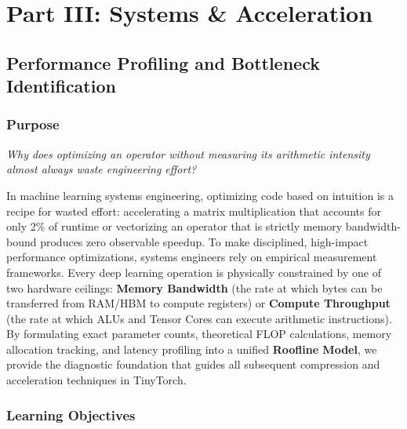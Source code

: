 \documentclass[
  letterpaper,
]{scrbook}
\begin{document}
\part{Part III: Systems \& Acceleration}

\chapter{Performance Profiling and Bottleneck
Identification}\label{performance-profiling-and-bottleneck-identification}

\section*{Purpose}\label{purpose-16}


\emph{Why does optimizing an operator without measuring its arithmetic
intensity almost always waste engineering effort?}

In machine learning systems engineering, optimizing code based on
intuition is a recipe for wasted effort: accelerating a matrix
multiplication that accounts for only 2\% of runtime or vectorizing an
operator that is strictly memory bandwidth-bound produces zero
observable speedup. To make disciplined, high-impact performance
optimizations, systems engineers rely on empirical measurement
frameworks. Every deep learning operation is physically constrained by
one of two hardware ceilings: \textbf{Memory Bandwidth} (the rate at
which bytes can be transferred from RAM/HBM to compute registers) or
\textbf{Compute Throughput} (the rate at which ALUs and Tensor Cores can
execute arithmetic instructions). By formulating exact parameter counts,
theoretical FLOP calculations, memory allocation tracking, and latency
profiling into a unified \textbf{Roofline Model}, we provide the
diagnostic foundation that guides all subsequent compression and
acceleration techniques in TinyTorch.

\section{Learning Objectives}\label{learning-objectives-14}
\end{document}
